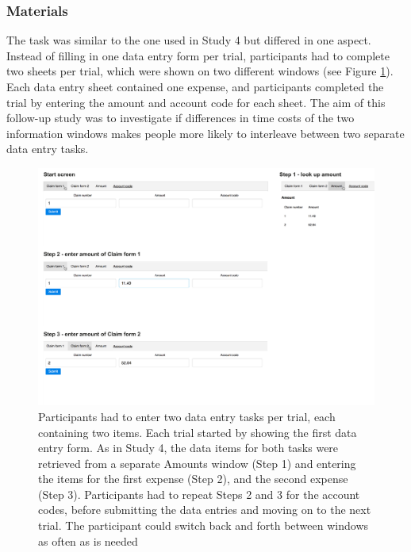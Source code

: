 \subsubsection{Materials}
The task was similar to the one used in Study 4 but differed in one aspect. Instead of filling in one data entry form per trial, participants had to complete two sheets per trial, which were shown on two different windows (see Figure \ref{fig:ch34_5-tasklayout}). Each data entry sheet contained one expense, and participants completed the trial by entering the amount and account code for each sheet. The aim of this follow-up study was to investigate if differences in time costs of the two information windows makes people more likely to interleave between two separate data entry tasks.

\begin{figure}
\includegraphics[width=\textwidth]{images/ch34/ch34-5_Tasksequence.pdf}
    \caption[Study 5 data entry task layout]{Participants had to enter two data entry tasks per trial, each containing two items. Each trial started by showing the first data entry form. As in Study 4, the data items for both tasks were retrieved from a separate Amounts window (Step 1) and entering the items for the first expense (Step 2), and the second expense (Step 3). Participants had to repeat Steps 2 and 3 for the account codes, before submitting the data entries and moving on to the next trial. The participant could switch back and forth between windows as often as is needed}\label{fig:ch34_5-tasklayout}
\end{figure}

